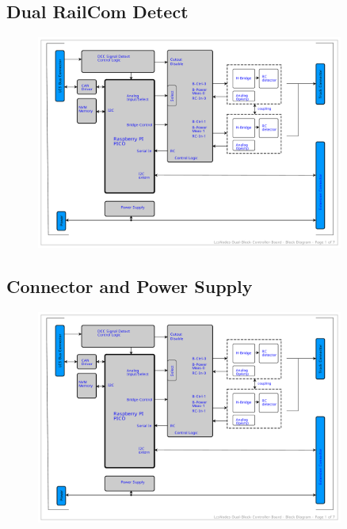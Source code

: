 \subsection{Dual RailCom Detect}

\begin{figure}[htbp]
    \centering
    \includegraphics[page=6, width=0.9\textwidth]{./Schematics/Schematic_LcsNodes-Dual-Block-Controller.pdf}
\end{figure}
\FloatBarrier

\subsection{Connector and Power Supply}

\begin{figure}[htbp]
    \centering
    \includegraphics[page=7, width=0.9\textwidth]{./Schematics/Schematic_LcsNodes-Dual-Block-Controller.pdf}
\end{figure}
\FloatBarrier

